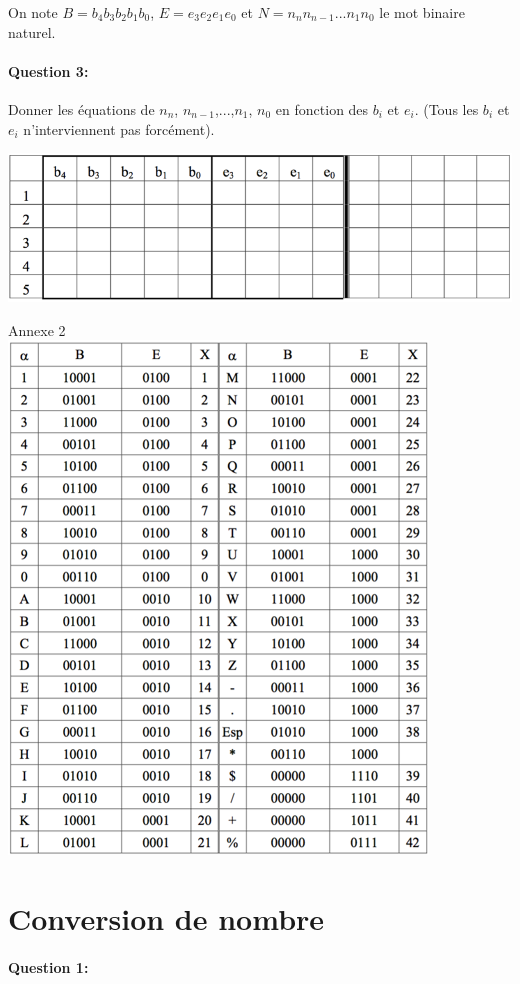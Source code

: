 On note $B=b_4b_3b_2b_1b_0$, $E=e_3e_2e_1e_0$ et $N=n_nn_{n-1}...n_1n_0$ le mot binaire naturel.

\paragraph{Question 3:} Donner les équations de $n_n$, $n_{n-1}$,...,$n_1$, $n_0$ en fonction des $b_i$ et $e_i$. (Tous les $b_i$ et $e_i$ n'interviennent pas forcément). 

\begin{center}
 \includegraphics[width=0.7\linewidth]{img/figure04}
\end{center}


\begin{center}
Annexe 2 \\
 \includegraphics[width=0.6\linewidth]{img/figure06}
\end{center}

\section{Conversion de nombre}

\paragraph{Question 1:}

